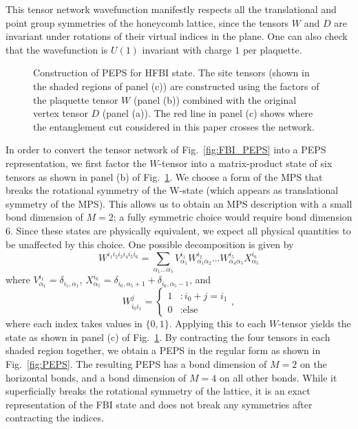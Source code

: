 {This tensor network wavefunction manifestly respects all the
translational and point group symmetries of the honeycomb lattice,
since the tensors $W$ and $D$ are invariant under rotations of their
virtual indices in the plane. One can also check that the
wavefunction is $U(1)$ invariant with charge $1$ per plaquette.

\begin{figure}
	\centering
	\quad
\label{fig:PEPSforFBI}
\caption{Construction of PEPS for HFBI state. 
The site tensors (shown in the shaded regions of panel (c)) are constructed
using the factors of the plaquette tensor $W$ (panel (b))
combined with the original vertex tensor $D$ (panel (a)).
The red line in panel (c) shows where the entanglement cut considered in this paper
crosses the network.
}
\end{figure}

In order to convert the tensor network of Fig.~\ref{fig:FBI_PEPS} into a PEPS representation,
we first factor the $W$-tensor into a matrix-product state
of six tensors as shown in panel (b) of Fig.~\ref{fig:PEPSforFBI}. We
choose a form of the MPS that breaks the rotational symmetry
of the W-state (which appears as translational symmetry of the MPS).
This allows us to obtain an MPS description with a small bond dimension
of $M=2$; a fully symmetric choice would require bond dimension 6.
Since these states are physically equivalent, we expect all
physical quantities to be unaffected by this choice.
One possible decomposition is given by
\begin{equation}
W^{i_1 i_2 i_3 i_4 i_5 i_6} = \sum\limits_{\alpha_1 \ldots \alpha_5} V^{i_1}_{\alpha_1} W^{i_2}_{\alpha_1 \alpha_2}
\ldots
W^{i_5}_{\alpha_4 \alpha_5} X^{i_6}_{\alpha_5}
\end{equation}
where $V^{i_1}_{\alpha_1} = \delta_{i_1, \alpha_1}$, $X^{i_6}_{\alpha_5} = \delta_{i_6,\alpha_5+1}+\delta_{i_6,\alpha_5-1}$, and
\begin{equation*}
W_{i_0 i_1}^{j}  = \left\{ \begin{array}{ll}
													1  &:  i_0+j=i_1 \\
													0  &:  \text{else}
													\end{array}
											\right.,
\end{equation*}
where each index takes values in $\{0, 1\}$. Applying this to each
$W$-tensor yields the state as shown in panel (c) of
Fig.~\ref{fig:PEPSforFBI}. By contracting the four tensors in each
shaded region together, we obtain a PEPS in the regular form as shown
in Fig.~\ref{fig:PEPS}. The resulting PEPS has a bond dimension of
$M=2$ on the horizontal bonds, and a bond dimension of $M=4$ on all
other bonds. While it superficially breaks
the rotational symmetry of the lattice, it is an exact representation
of the FBI state and does not break any symmetries after contracting
the indices.

}
